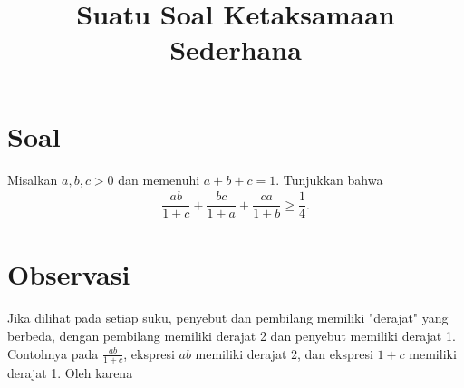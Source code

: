 \documentclass[12pt]{scrartcl}
\title{Suatu Soal Ketaksamaan Sederhana}
\author{}
\date{}
\begin{document}
\maketitle
\pagestyle{plain}
\vspace{-1.5cm}
\section{Soal}
Misalkan $a,b,c > 0$ dan memenuhi $a+b+c=1$. Tunjukkan bahwa
\begin{align*}
\dfrac{ab}{1+c}+\dfrac{bc}{1+a}+\dfrac{ca}{1+b} \ge \dfrac{1}{4}.
\end{align*}

\newpage
\section{Observasi}
Jika dilihat pada setiap suku, penyebut dan pembilang memiliki "derajat" yang berbeda, dengan pembilang memiliki derajat 2 dan penyebut memiliki derajat 1. Contohnya pada $\frac{ab}{1+c}$, ekspresi $ab$ memiliki derajat 2, dan ekspresi $1+c$ memiliki derajat 1. Oleh karena
\end{document}
